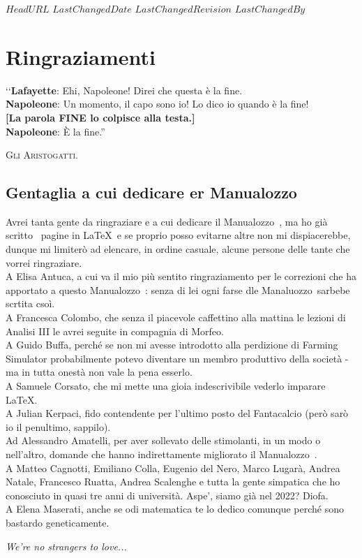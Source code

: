 \svnidlong
{$HeadURL$}
{$LastChangedDate$}
{$LastChangedRevision$}
{$LastChangedBy$}

\chapter{Ringraziamenti}

\begin{introduction}
‘‘\textbf{Lafayette}: Ehi, Napoleone! Direi che questa è la fine.\\
\textbf{Napoleone}: Un momento, il capo sono io! Lo dico io quando è la fine!\\
\textbf{[La parola \textsf{FINE} lo colpisce alla testa.]}\\
\textbf{Napoleone}: È la fine.''
\begin{flushright}
	\textsc{Gli Aristogatti.}
\end{flushright}
\end{introduction}

\section*{Gentaglia a cui dedicare er Manualozzo\texttrademark\ }
Avrei tanta gente da ringraziare e a cui dedicare il Manualozzo\texttrademark\ , ma ho già scritto \thelastpage\  pagine in \LaTeX\ e se proprio posso evitarne altre non mi dispiacerebbe, dunque mi limiterò ad elencare, in ordine casuale, alcune persone delle tante che vorrei ringraziare.\\
A Elisa Antuca, a cui va il mio più sentito ringraziamento per le correzioni che ha apportato a questo Manualozzo\texttrademark\ : senza di lei ogni farse dle Manaluozzo\texttrademark\  sarbebe scrtita csoì.\\
A Francesca Colombo, che senza il piacevole caffettino alla mattina le lezioni di Analisi III le avrei seguite in compagnia di Morfeo.\\
A Guido Buffa, perché se non mi avesse introdotto alla perdizione di Farming Simulator probabilmente potevo diventare un membro produttivo della società - ma in tutta onestà non vale la pena esserlo.\\
A Samuele Corsato, che mi mette una gioia indescrivibile vederlo imparare \LaTeX.\\
A Julian Kerpaci, fido contendente per l'ultimo posto del Fantacalcio (però sarò io il penultimo, sappilo).\\
Ad Alessandro Amatelli, per aver sollevato delle stimolanti, in un modo o nell'altro, domande che hanno indirettamente migliorato il Manualozzo\texttrademark\ .\\
A Matteo Cagnotti, Emiliano Colla, Eugenio del Nero, Marco Lugarà, Andrea Natale, Francesco Ruatta, Andrea Scalenghe e tutta la gente simpatica che ho conosciuto in quasi tre anni di università. {\small Aspe', siamo già nel 2022?} {\tiny Diofa.}\\
A Elena Maserati, anche se odi matematica te lo dedico comunque perché sono bastardo geneticamente.
\vfill
\begin{flushright}
	\textit{We're no strangers to love...}
\end{flushright}